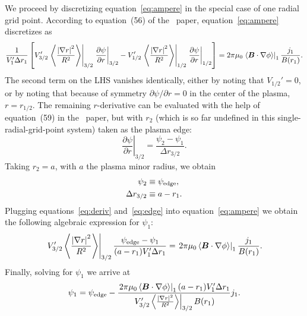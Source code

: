 \documentclass{notes}
\begin{document}
    We proceed by discretizing equation~\eqref{eq:ampere} in the special case of
    one radial grid point. According to equation~(56) of the \DREAM\ paper,
    equation~\eqref{eq:ampere} discretizes as
    \begin{equation}\label{eq:discr}
        \frac{1}{V_1'\Delta r_1}\left[
            V_{3/2}'
            \left.\left\langle\frac{\left|\nabla r\right|^2}{R^2}\right\rangle\right|_{3/2}
            \left.\frac{\partial\psi}{\partial r}\right|_{3/2}
            -
            V_{1/2}'
            \left.\left\langle\frac{\left|\nabla r\right|^2}{R^2}\right\rangle\right|_{1/2}
            \left.\frac{\partial\psi}{\partial r}\right|_{1/2}
        \right]
        = 2\pi\mu_0\left.\left\langle\boldsymbol{B}\cdot\nabla\phi\right\rangle\right|_{1}
        \frac{j_1}{B(r_1)}.
    \end{equation}
    The second term on the LHS vanishes identically, either by noting that
    $V_{1/2}' = 0$, or by noting that because of symmetry
    $\partial\psi/\partial r = 0$ in the center of the plasma, $r=r_{1/2}$.
    The remaining $r$-derivative can be evaluated with the help of
    equation~(59) in the \DREAM\ paper, but with $r_{2}$ (which is so far
    undefined in this single-radial-grid-point system) taken as the plasma
    edge:
    \begin{equation}\label{eq:deriv}
        \left.\frac{\partial\psi}{\partial r}\right|_{3/2} =
        \frac{\psi_2-\psi_1}{\Delta r_{3/2}}.
    \end{equation}
    Taking $r_2=a$, with $a$ the plasma minor radius, we obtain
    \begin{equation}
        \begin{aligned}\label{eq:edge}
            \psi_2 &\equiv \psi_{\rm edge},\\
            \Delta r_{3/2} &\equiv a-r_1.
        \end{aligned}
    \end{equation}
    Plugging equations~\eqref{eq:deriv} and~\eqref{eq:edge} into
    equation~\eqref{eq:ampere} we obtain the following algebraic expression for
    $\psi_1$:
    \begin{equation}
        \left.V_{3/2}'\left\langle\frac{\left|\nabla r\right|^2}{R^2}\right\rangle\right|_{3/2}
        \frac{\psi_{\rm edge} - \psi_1}{(a-r_1)V_1'\Delta r_1}
        =
        \left.2\pi\mu_0\left\langle \boldsymbol{B}\cdot\nabla\phi \right\rangle\right|_1
        \frac{j_1}{B(r_1)}.
    \end{equation}
    Finally, solving for $\psi_1$ we arrive at
    \begin{equation}
        \psi_1 = \psi_{\rm edge} -
        \frac{
            \left.2\pi\mu_0\left\langle \boldsymbol{B}\cdot\nabla\phi \right\rangle\right|_1
            (a-r_1)V_1'\Delta r_1
        }{
            \left.V_{3/2}'\left\langle\frac{\left|\nabla r\right|^2}{R^2}\right\rangle\right|_{3/2}
            B(r_1)
        } j_1.
    \end{equation}
\end{document}
